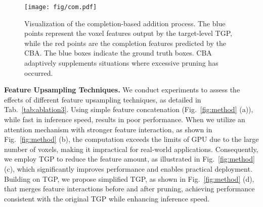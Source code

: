 \begin{figure*}[t]
	\centering
	\texttt{[image: fig/com.pdf]}
    \vspace{-.2cm}
    \caption{Visualization of the completion-based addition process. The blue points represent the voxel features output by the target-level TGP, while the red points are the completion features predicted by the CBA. The blue boxes indicate the ground truth boxes. CBA adaptively supplements situations where excessive pruning has occurred.}
	\label{fig:com}
    \vspace{-.1cm}
\end{figure*}

\textbf{Feature Upsampling Techniques.}
We conduct experiments to assess the effects of different feature upsampling techniques, as detailed in Tab.~\ref{tab:ablation3}. Using simple feature concatenation (Fig.~\ref{fig:method} (a)), while fast in inference speed, results in poor performance. When we utilize an attention mechanism with stronger feature interaction, as shown in Fig.~\ref{fig:method} (b), the computation exceeds the limits of GPU due to the large number of voxels, making it impractical for real-world applications. Consequently, we employ TGP to reduce the feature amount, as illustrated in Fig.~\ref{fig:method} (c), which significantly improves performance and enables practical deployment. Building on TGP, we propose simplified TGP, as shown in Fig.~\ref{fig:method} (d), that merges feature interactions before and after pruning, achieving performance consistent with the original TGP while enhancing inference speed.



